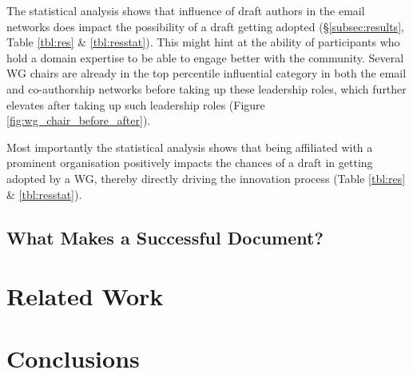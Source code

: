 \documentclass[twocolumn,10pt]{article}
\begin{document}
The statistical analysis shows that influence of draft authors in the email
networks does impact the possibility of a draft getting adopted
(\S\ref{subsec:results}, Table \ref{tbl:res} \& \ref{tbl:resstat}). This
might hint at the ability of participants who hold a domain expertise to be
able to engage better with the community. Several WG chairs are already in
the top percentile influential category in both the email and co-authorship
networks before taking up these leadership roles, which further elevates
after taking up such leadership roles (Figure
\ref{fig:wg_chair_before_after}).

Most importantly the statistical analysis shows that being affiliated with
a prominent organisation positively impacts the chances of a draft in
getting adopted by a WG, thereby directly driving the innovation process
(Table \ref{tbl:res} \& \ref{tbl:resstat}).

\subsection{What Makes a Successful Document?}


\section{Related Work}

%
%



\section{Conclusions}
\end{document}

